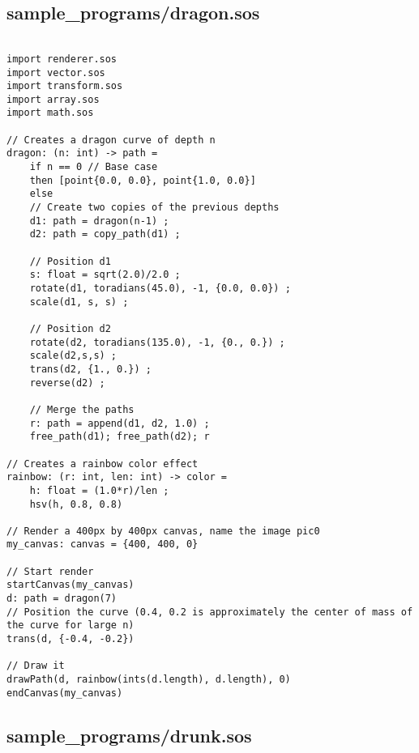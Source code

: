 \documentclass[main.tex]{subfiles}
\begin{document}
\subsection{sample\_programs/dragon.sos}

\begin{lstlisting}

import renderer.sos
import vector.sos
import transform.sos
import array.sos
import math.sos

// Creates a dragon curve of depth n
dragon: (n: int) -> path = 
    if n == 0 // Base case
    then [point{0.0, 0.0}, point{1.0, 0.0}]
    else
    // Create two copies of the previous depths
    d1: path = dragon(n-1) ; 
    d2: path = copy_path(d1) ;

    // Position d1
    s: float = sqrt(2.0)/2.0 ;
    rotate(d1, toradians(45.0), -1, {0.0, 0.0}) ; 
    scale(d1, s, s) ; 

    // Position d2
    rotate(d2, toradians(135.0), -1, {0., 0.}) ;
    scale(d2,s,s) ;
    trans(d2, {1., 0.}) ;
    reverse(d2) ;

    // Merge the paths
    r: path = append(d1, d2, 1.0) ;
    free_path(d1); free_path(d2); r

// Creates a rainbow color effect
rainbow: (r: int, len: int) -> color = 
    h: float = (1.0*r)/len ;
    hsv(h, 0.8, 0.8)

// Render a 400px by 400px canvas, name the image pic0
my_canvas: canvas = {400, 400, 0}

// Start render
startCanvas(my_canvas)
d: path = dragon(7)
// Position the curve (0.4, 0.2 is approximately the center of mass of the curve for large n)
trans(d, {-0.4, -0.2})

// Draw it
drawPath(d, rainbow(ints(d.length), d.length), 0)
endCanvas(my_canvas)
\end{lstlisting}

\subsection{sample\_programs/drunk.sos}
\end{document}
